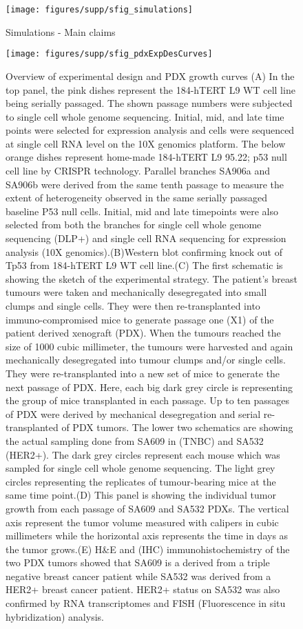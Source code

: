 \begin{figure}
\centering
\texttt{[image: figures/supp/sfig\_simulations]}
\caption{Simulations - Main claims}
\label{sfig:simul}
\end{figure}


\begin{figure}
\centering
\texttt{[image: figures/supp/sfig\_pdxExpDesCurves]}
\caption{Overview of experimental design and PDX growth curves
(A)	In the top panel, the pink dishes represent the 184-hTERT L9 WT cell line 
being serially passaged. 
The shown passage numbers were subjected to single cell whole genome sequencing. 
Initial, mid, and late time points were selected for expression analysis and cells were sequenced at single cell RNA level on the 10X genomics platform. 
The below orange dishes represent home-made 184-hTERT L9 95.22; p53 null cell line by CRISPR technology. 
Parallel branches SA906a and SA906b were derived from the same tenth passage to measure the extent of heterogeneity observed in the same serially passaged baseline P53 null cells. 
Initial, mid and late timepoints were also selected from both the branches for single cell whole genome sequencing (DLP+) and single cell RNA sequencing for  expression analysis (10X genomics).(B)Western blot confirming knock out of Tp53 from 184-hTERT L9 WT cell line.(C) The first schematic is showing the sketch of the experimental strategy. The patient’s breast tumours were taken and mechanically desegregated into small clumps and single cells. They were then re-transplanted into immuno-compromised mice to generate passage one (X1) of the patient derived xenograft (PDX). When the tumours reached the size of 1000 cubic millimeter, the tumours were harvested and again mechanically desegregated into tumour clumps and/or single cells. They were re-transplanted into a new set of mice to generate the next passage of PDX. Here, each big dark grey circle is representing the group of mice transplanted in each passage. Up to ten passages of PDX were derived by mechanical desegregation and serial re-transplanted of PDX tumors. The lower two schematics are showing the actual sampling done from SA609 in (TNBC) and SA532 (HER2+). The dark grey circles represent each mouse which was sampled for single cell whole genome sequencing. The light grey circles representing the replicates of tumour-bearing mice at the same time point.(D) This panel is showing the individual tumor growth from each passage of SA609 and SA532 PDXs. The vertical axis represent the tumor volume measured with calipers in cubic millimeters while the horizontal axis represents the time in days as the tumor grows.(E) H\&E and (IHC) immunohistochemistry of the two PDX tumors showed that SA609 is a derived from a triple negative breast cancer patient while SA532 was derived from a HER2+ breast cancer patient. HER2+ status on SA532 was also confirmed by RNA transcriptomes and FISH (Fluorescence in situ hybridization) analysis.}
\label{sfig:pdxExpDesCurves}
\end{figure}

